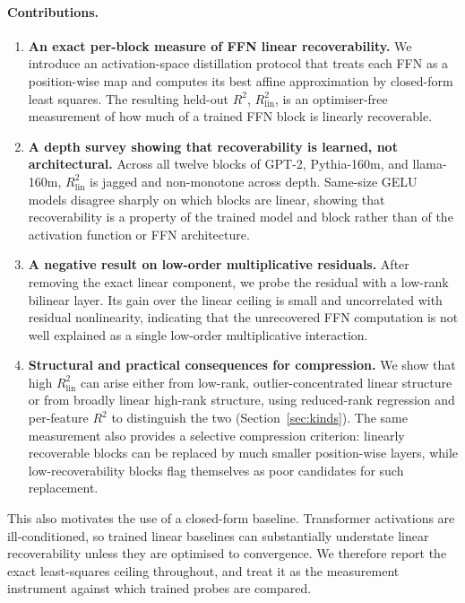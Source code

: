 \documentclass{article}
\newcommand{\Rlin}{R^2_{\mathrm{lin}}}
\begin{document}
\paragraph{Contributions.}
\begin{enumerate}
\item \textbf{An exact per-block measure of FFN linear recoverability.} We introduce an
  activation-space distillation protocol that treats each FFN as a position-wise map and
  computes its best affine approximation by closed-form least squares. The resulting held-out
  $R^2$, $\Rlin$, is an optimiser-free measurement of how much of a trained FFN block is
  linearly recoverable.
\item \textbf{A depth survey showing that recoverability is learned, not architectural.}
  Across all twelve blocks of GPT-2, Pythia-160m, and llama-160m, $\Rlin$ is jagged and
  non-monotone across depth. Same-size GELU models disagree sharply on which blocks are
  linear, showing that recoverability is a property of the trained model and block rather
  than of the activation function or FFN architecture.
\item \textbf{A negative result on low-order multiplicative residuals.} After removing the
  exact linear component, we probe the residual with a low-rank bilinear layer. Its gain over
  the linear ceiling is small and uncorrelated with residual nonlinearity, indicating that
  the unrecovered FFN computation is not well explained as a single low-order multiplicative
  interaction.
\item \textbf{Structural and practical consequences for compression.} We show that high
  $\Rlin$ can arise either from low-rank, outlier-concentrated linear structure or from
  broadly linear high-rank structure, using reduced-rank regression and per-feature $R^2$ to
  distinguish the two (Section~\ref{sec:kinds}). The same measurement also provides a
  selective compression criterion: linearly recoverable blocks can be replaced by much
  smaller position-wise layers, while low-recoverability blocks flag themselves as poor
  candidates for such replacement.
\end{enumerate}

This also motivates the use of a closed-form baseline. Transformer activations are
ill-conditioned, so trained linear baselines can substantially understate linear
recoverability unless they are optimised to convergence. We therefore report the exact
least-squares ceiling throughout, and treat it as the measurement instrument against which
trained probes are compared.
\end{document}
